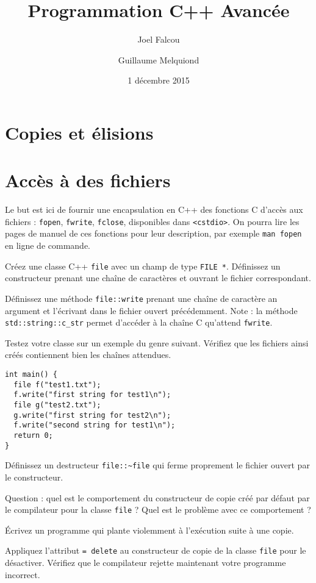 \documentclass[a4paper]{article}
\title{\vspace{-2cm}Programmation C++ Avancée}
\author{Joel Falcou \and Guillaume Melquiond}
\date{1 décembre 2015}
\begin{document}
\maketitle

\section{Copies et élisions}

\section{Accès à des fichiers}

Le but est ici de fournir une encapsulation en C++ des fonctions C
d'accès aux fichiers : \lstinline|fopen|, \lstinline|fwrite|,
\lstinline|fclose|, disponibles dans \lstinline|<cstdio>|. On pourra lire
les pages de manuel de ces fonctions pour leur description, par exemple
\lstinline|man fopen| en ligne de commande.

Créez une classe C++ \lstinline|file| avec un champ de type
\lstinline|FILE *|. Définissez un constructeur prenant une chaîne de
caractères et ouvrant le fichier correspondant.

Définissez une méthode \lstinline|file::write| prenant une chaîne de
caractère an argument et l'écrivant dans le fichier ouvert
précédemment. Note : la méthode \lstinline|std::string::c_str| permet
d'accéder à la chaîne C qu'attend \lstinline|fwrite|.

Testez votre classe sur un exemple du genre suivant. Vérifiez que les
fichiers ainsi créés contiennent bien les chaînes attendues.
\begin{lstlisting}
int main() {
  file f("test1.txt");
  f.write("first string for test1\n");
  file g("test2.txt");
  g.write("first string for test2\n");
  f.write("second string for test1\n");
  return 0;
}
\end{lstlisting}

Définissez un destructeur \lstinline|file::~file| qui ferme proprement le
fichier ouvert par le constructeur.

Question : quel est le comportement du constructeur de copie créé par
défaut par le compilateur pour la classe \lstinline|file| ? Quel est le
problème avec ce comportement ?

Écrivez un programme qui plante violemment à l'exécution suite à une copie.

Appliquez l'attribut \lstinline|= delete| au constructeur de copie de la
classe \lstinline|file| pour le désactiver. Vérifiez que le compilateur
rejette maintenant votre programme incorrect.
\end{document}
